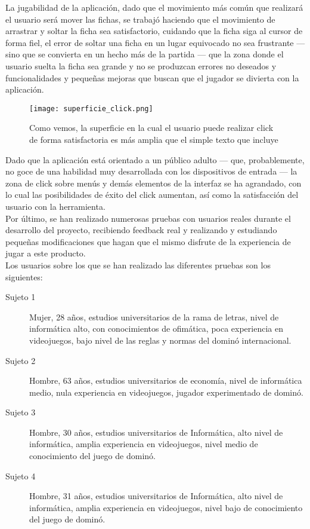 La jugabilidad de la aplicación, dado que el movimiento más común que realizará el usuario será mover las fichas,
se trabajó haciendo que el movimiento de arrastrar y soltar la ficha sea satisfactorio, cuidando que la ficha siga
al cursor de forma fiel, el error de soltar una ficha en un lugar equivocado no sea frustrante --- sino que se convierta
en un hecho más de la partida --- que la zona donde el usuario suelta la ficha sea grande y no se produzcan errores
no deseados y funcionalidades y pequeñas mejoras que buscan que el jugador se divierta con la aplicación. \\

\begin{figure}[h]
  \label{superficie_click}
  \begin{center}
    \texttt{[image: superficie\_click.png]}
  \end{center}
  \caption{Como vemos, la superficie en la cual el usuario puede realizar click de forma satisfactoria es más amplia que el simple texto que incluye}
\end{figure}

Dado que la aplicación está orientado a un público adulto --- que, probablemente, no goce de una habilidad muy desarrollada
con los dispositivos de entrada --- la zona de click sobre menús y demás elementos de la interfaz se ha agrandado, con lo
cual las posibilidades de éxito del click aumentan, así como la satisfacción del usuario con la herramienta. \\

Por último, se han realizado numerosas pruebas con usuarios reales durante el desarrollo del proyecto, recibiendo
feedback real y realizando y estudiando pequeñas modificaciones que hagan que el mismo disfrute de la experiencia de
jugar a este producto. \\

Los usuarios sobre los que se han realizado las diferentes pruebas son los siguientes:

\begin{description}
    \item[Sujeto 1] Mujer, 28 años, estudios universitarios de la rama de letras, nivel de informática alto, con conocimientos
        de ofimática, poca experiencia en videojuegos, bajo nivel de las reglas y normas del dominó internacional.
    \item[Sujeto 2] Hombre, 63 años, estudios universitarios de economía, nivel de informática medio, nula experiencia en
        videojuegos, jugador experimentado de dominó.
    \item[Sujeto 3] Hombre, 30 años, estudios universitarios de Informática, alto nivel de informática, amplia experiencia
        en videojuegos, nivel medio de conocimiento del juego de dominó.
    \item[Sujeto 4] Hombre, 31 años, estudios universitarios de Informática, alto nivel de informática, amplia experiencia
        en videojuegos, nivel bajo de conocimiento del juego de dominó.

\end{description}

